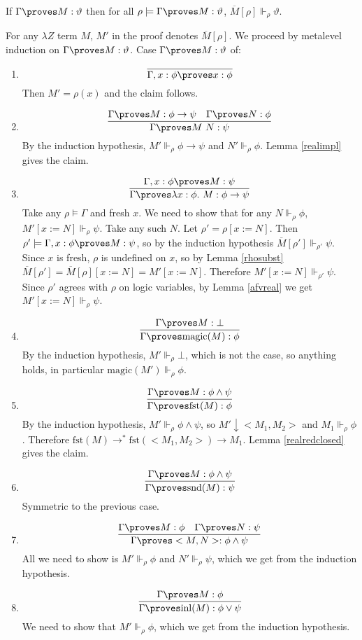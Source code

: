 \documentclass{LMCS}
\newcommand{\ov}[1]{\ensuremath{\overline{#1}}}
\newcommand\reals{\ensuremath{\Vdash}}
\newcommand{\p}{\proves}
\newcommand{\g}{\Gamma}
\newcommand{\gp}{\Gamma \proves}
\newcommand{\rrho}{\reals_\rho}
\newcommand{\pl}[1]{\ensuremath{\mathrm{#1}}}
\newcommand{\FST}{\pl{fst}}
\newcommand{\SND}{\pl{snd}}
\newcommand{\INL}{\pl{inl}}
\newcommand{\la}{\lambda Z}
\begin{document}
\begin{thm}[Normalization]\label{norm}
If $\gp M : \vartheta$ then for all $\rho \models \gp M : \vartheta$, $\ov{M}[\rho] \reals_\rho \vartheta$.
\end{thm}
\proof For any $\la$ term $M$, $M'$ in the proof denotes $\ov{M}[\rho]$.
We proceed by metalevel induction on $\gp M : \vartheta$. Case $\gp M : \vartheta$ of:
\begin{enumerate}[$\bullet$]
\item 
\[
\infer{\g, x : \phi \proves x : \phi}{}
\]
Then $M' = \rho(x)$ and the claim follows.
\item 
\[
\infer{\gp M\ N : \psi}{\gp M : \phi \to \psi & \gp N : \phi}
\]
By the induction hypothesis, $M' \reals_\rho \phi \to \psi$ and $N' \reals_\rho \phi$. Lemma
\ref{realimpl} gives the claim.
\item
\[
\infer{\gp \lambda x : \phi.\ M : \phi \to \psi}{\g, x : \phi \p M : \psi}
\]
Take any $\rho \models \g$ and fresh $x$. We need to show that for any $N \reals_\rho
\phi$, $M'[x:=N] \reals_\rho \psi$. Take any such $N$. Let
$\rho' = \rho[x:=N]$. Then $\rho' \models \Gamma, x : \phi \p M : \psi$, so by the
induction hypothesis $\ov{M}[\rho'] \reals_{\rho'} \psi$. Since $x$ is
fresh, $\rho$ is undefined on $x$, so by Lemma \ref{rhosubst} $\ov{M}[\rho']
= \ov{M}[\rho][x:=N] = M'[x:=N]$. Therefore $M'[x:=N] \reals_{\rho'}
\psi$. Since $\rho'$ agrees with $\rho$ on logic variables, by Lemma \ref{afvreal} we get $M'[x:=N] \reals_\rho \psi$.
\item 
\[
\infer{\gp \pl{magic}(M) : \phi}{\gp M : \bot}
\]
By the induction hypothesis, $M' \rrho \bot$, which is not the case, so
anything holds, in particular $\pl{magic}(M') \reals_\rho \phi$.
\item
\[
\infer{\gp \FST(M) : \phi}{\gp M : \phi \land \psi}
\]
By the induction hypothesis, $M' \reals_\rho \phi \land \psi$, so $M' \downarrow <M_1, M_2>$ and
$M_1 \reals_\rho \phi$. Therefore $\FST(M) \to^* \FST(<M_1, M_2>) \to M_1$.
Lemma \ref{realredclosed} gives the claim. 
\item 
\[
\infer{\gp \SND(M) : \psi}{\gp M : \phi \land \psi}
\]
Symmetric to the previous case. 
\item 
\[
\infer{\gp <M, N> : \phi \land \psi}{\gp M : \phi & \gp N : \psi}
\]
All we need to show is $M' \reals_\rho \phi$ and $N' \reals_\rho \psi$, which we
get from the induction hypothesis.
\item
\[
\infer{\gp \INL(M) : \phi \lor \psi}{\gp M : \phi}
\]
We need to show that $M' \reals_\rho \phi$, which we get from the induction hypothesis.

\end{enumerate}
\end{document}
